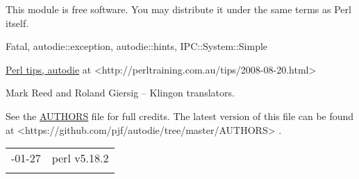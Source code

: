 \documentclass[]{article}
\renewcommand{\emph}[1]{\underline{#1}}
\begin{document}
This module is free software. You may distribute it under the same terms
as Perl itself.


Fatal, autodie::exception, autodie::hints, IPC::System::Simple

\emph{Perl tips, autodie} at
\textless{}http://perltraining.com.au/tips/2008-08-20.html\textgreater{}


Mark Reed and Roland Giersig -- Klingon translators.

See the \emph{AUTHORS} file for full credits. The latest version of this
file can be found at
\textless{}https://github.com/pjf/autodie/tree/master/AUTHORS\textgreater{}
.

\begin{longtable}[c]{@{}ll@{}}
\toprule\addlinespace
2014-01-27 & perl v5.18.2
\\\addlinespace
\bottomrule
\end{longtable}
\end{document}
